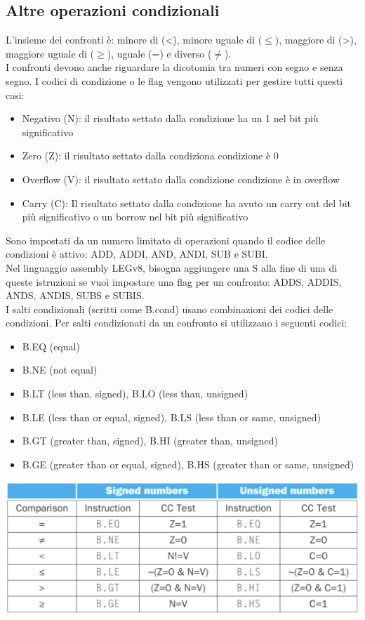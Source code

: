 \documentclass[12pt,a4paper]{article}
\begin{document}
\subsection{Altre operazioni condizionali}
L'insieme dei confronti è: minore di (<), minore uguale di ($\leq$), maggiore di (>), maggiore uguale di ($\geq$), uguale (=) e diverso ($\not =$).\\
I confronti devono anche riguardare la dicotomia tra numeri con segno e senza segno. I codici di condizione o le flag vengono utilizzati per gestire tutti questi casi:\begin{itemize}
\item Negativo (N): il risultato settato dalla condizione ha un 1 nel bit più significativo
\item Zero (Z): il risultato settato dalla condiziona condizione è 0
\item Overflow (V): il risultato settato dalla condizione condizione è in overflow
\item Carry (C): Il risultato settato dalla condizione ha avuto un carry out del bit più significativo o un borrow nel bit più significativo
\end{itemize}
Sono impostati da un numero limitato di operazioni quando il codice delle condizioni è attivo: ADD, ADDI, AND, ANDI, SUB e SUBI.\\
Nel linguaggio assembly LEGv8, bisogna aggiungere una S alla fine di una di queste istruzioni se vuoi impostare una flag per un confronto: ADDS, ADDIS, ANDS, ANDIS, SUBS e SUBIS.\\
I salti condizionali (scritti come B.cond) usano combinazioni dei codici delle condizioni. Per salti condizionati da un confronto si utilizzano i seguenti codici:
\begin{itemize}
\item B.EQ (equal)
\item B.NE (not equal)
\item B.LT (less than, signed), B.LO (less than, unsigned)
\item B.LE (less than or equal, signed), B.LS (less than or same, unsigned)
\item B.GT (greater than, signed), B.HI (greater than, unsigned)
\item B.GE (greater than or equal, signed), B.HS (greater than or same, unsigned)
\end{itemize}
\begin{center}
\includegraphics[width=0.7\columnwidth]{img/comparison.png}
\end{center}
\end{document}
